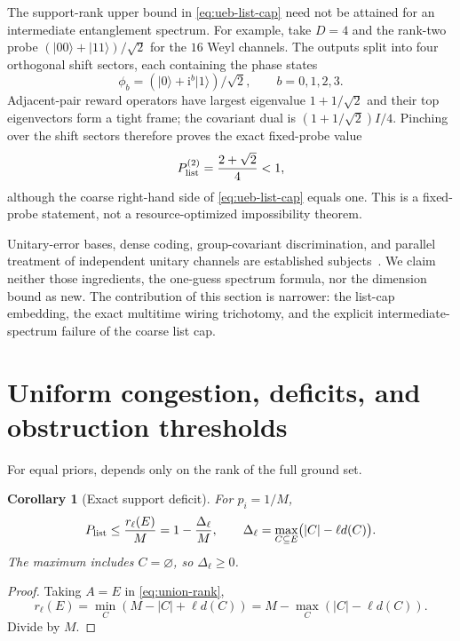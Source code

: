 \documentclass[11pt]{article}
\newtheorem{corollary}[theorem]{Corollary}
\theoremstyle{definition}
\theoremstyle{remark}
\newcommand{\ket}[1]{\lvert #1\rangle}
\begin{document}
The support-rank upper bound in \eqref{eq:ueb-list-cap} need not be attained
for an intermediate entanglement spectrum.  For example, take $D=4$ and the
rank-two probe $(\ket{00}+\ket{11})/\sqrt2$ for the $16$ Weyl channels.  The
outputs split into four orthogonal shift sectors, each containing the phase
states
\[
 \phi_b=(\ket0+\mathrm{i}^b\ket1)/\sqrt2,
 \qquad b=0,1,2,3.
\]
Adjacent-pair reward operators have largest eigenvalue $1+1/\sqrt2$ and
their top eigenvectors form a tight frame; the covariant dual is
$(1+1/\sqrt2)I/4$.  Pinching over the shift sectors therefore proves the exact
fixed-probe value
\begin{equation}\label{eq:rank-two-list}
 P_{\rm list}^{(2)}=\frac{2+\sqrt2}{4}<1,
\end{equation}
although the coarse right-hand side of \eqref{eq:ueb-list-cap} equals one.
This is a fixed-probe statement, not a resource-optimized impossibility
theorem.

Unitary-error bases, dense coding, group-covariant discrimination, and
parallel treatment of independent unitary channels are established
subjects~\cite{feng2006,sacchi2005,wu2006,chiribella2008,zhuang2020,bavaresco2022}.
We claim neither those ingredients, the one-guess spectrum formula, nor the
dimension bound as new.  The contribution of this section is narrower: the
list-cap embedding, the exact multitime wiring trichotomy, and the explicit
intermediate-spectrum failure of the coarse list cap.

\section{Uniform congestion, deficits, and obstruction thresholds}\label{sec:deficit}

For equal priors,  depends only on the rank of the full ground
set.

\begin{corollary}[Exact support deficit]\label{cor:deficit}
For $p_i=1/M$,
\begin{equation}\label{eq:deficit}
 P_{\rm list}\leq\frac{r_\ell(E)}{M}
 =1-\frac{\Delta_\ell}{M},\qquad
 \Delta_\ell=\max_{C\subseteq E}\bigl(|C|-\ell d(C)\bigr).
\end{equation}
The maximum includes $C=\varnothing$, so $\Delta_\ell\geq0$.
\end{corollary}

\begin{proof}
Taking $A=E$ in \eqref{eq:union-rank},
\[
 r_\ell(E)=\min_C(M-|C|+\ell d(C))
 =M-\max_C(|C|-\ell d(C)).
\]
Divide by $M$.
\end{proof}
\end{document}
